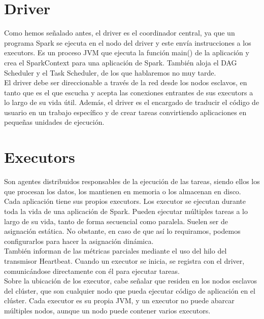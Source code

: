 \section{Driver}
 
Como hemos señalado antes, el driver es el coordinador central, ya que un programa Spark se ejecuta en el nodo del driver y este envía instrucciones a los executors. Es un proceso JVM que ejecuta la función main() de la aplicación y crea el SparkContext para una aplicación de Spark. También aloja el DAG Scheduler y el Task Scheduler, de los que hablaremos no muy tarde.\\

El driver debe ser direccionable a través de la red desde los nodos esclavos, en tanto que es el que escucha y acepta las conexiones entrantes de sus executors a lo largo de su vida útil. Además, el driver es el encargado de traducir el código de usuario en un trabajo específico y de crear tareas convirtiendo aplicaciones en pequeñas unidades de ejecución.\\
 
\section{Executors}
 
Son agentes distribuidos responsables de la ejecución de las tareas, siendo ellos los que procesan los datos, los mantienen en memoria o los almacenan en disco.\\
 
Cada aplicación tiene sus propios executors. Los executor se ejecutan durante toda la vida de una aplicación de Spark. Pueden ejecutar múltiples tareas a lo largo de su vida, tanto de forma secuencial como paralela. Suelen ser de asignación estática. No obstante, en caso de que así lo requiramos, podemos configurarlos para hacer la asignación dinámica.\\
 
También informan de las métricas parciales mediante el uso del hilo del transmisor Heartbeat. Cuando un executor se inicia, se registra con el driver, comunicándose directamente con él para ejecutar tareas.\\
 
Sobre la ubicación de los executor, cabe señalar que residen en los nodos esclavos del clúster, que son cualquier nodo que pueda ejecutar código de aplicación en el clúster. Cada executor es su propia JVM, y un executor no puede abarcar múltiples nodos, aunque un nodo puede contener varios executors.\\
 
